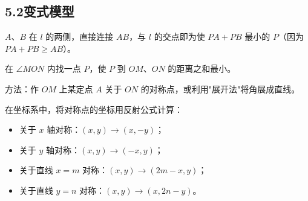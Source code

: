 \documentclass[12pt, a4paper]{ctexart}
\begin{document}
\begin{center}
\end{center}

\subsection*{5.2\quad 变式模型}

\begin{knowledgebox}[变式1：两点在直线两侧]
$A$、$B$ 在 $l$ 的两侧，直接连接 $AB$，与 $l$ 的交点即为使 $PA+PB$ 最小的 $P$（因为 $PA+PB\ge AB$）。
\end{knowledgebox}

\begin{knowledgebox}[变式2：角内找点到两边距离和最小]
在 $\angle MON$ 内找一点 $P$，使 $P$ 到 $OM$、$ON$ 的距离之和最小。

方法：作 $OM$ 上某定点 $A$ 关于 $ON$ 的对称点，或利用"展开法"将角展成直线。
\end{knowledgebox}

\begin{knowledgebox}[变式3：坐标系中的最短路径]
在坐标系中，将对称点的坐标用反射公式计算：
\begin{itemize}
  \item 关于 $x$ 轴对称：$(x,y)\to(x,-y)$；
  \item 关于 $y$ 轴对称：$(x,y)\to(-x,y)$；
  \item 关于直线 $x=m$ 对称：$(x,y)\to(2m-x,y)$；
  \item 关于直线 $y=n$ 对称：$(x,y)\to(x,2n-y)$。
\end{itemize}
\end{knowledgebox}
\end{document}
